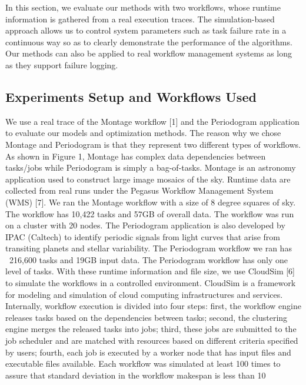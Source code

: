 \documentclass{IOS-Book-Article}
\begin{document}
In this section, we evaluate our methods with two workflows, whose runtime information is gathered from a real execution traces. The simulation-based approach allows us to control system parameters such as task failure rate in a continuous way so as to clearly demonstrate the performance of the algorithms. Our methods can also be applied to real workflow management systems as long as they support failure logging. 

\subsection{Experiments Setup and Workflows Used}
We use a real trace of the Montage workflow [1] and the Periodogram application to evaluate our models and optimization methods. The reason why we chose Montage and Periodogram is that they represent two different types of workflows. As shown in Figure 1, Montage has complex data dependencies between tasks/jobs while Periodogram is simply a bag-of-tasks. Montage is an astronomy application used to construct large image mosaics of the sky.  Runtime data are collected from real runs under the Pegasus Workflow Management System (WMS) [7]. We ran the Montage workflow with a size of 8 degree squares of sky. The workflow has 10,422 tasks and 57GB of overall data. The workflow was run on a cluster with 20 nodes. The Periodogram application is also developed by IPAC (Caltech) to identify periodic signals from light curves that arise from transiting planets and stellar variability. The Periodogram workflow we ran has ~216,600 tasks and 19GB input data. The Periodogram workflow has only one level of tasks. 
With these runtime information and file size, we use CloudSim [6] to simulate the workflows in a controlled environment.  CloudSim is a framework for modeling and simulation of cloud computing infrastructures and services. Internally, workflow execution is divided into four steps: first, the workflow engine releases tasks based on the dependencies between tasks; second, the clustering engine merges the released tasks into jobs; third, these jobs are submitted to the job scheduler and are matched with resources based on different criteria specified by users; fourth, each job is executed by a worker node that has input files and executable files available. Each workflow was simulated at least 100 times to assure that standard deviation in the workflow makespan is less than 10%
\end{document}
